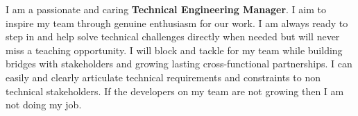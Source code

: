
\begin{cvsummary}
  \summary
    {I am a passionate and caring \textbf{Technical Engineering Manager}. I aim to inspire my team through genuine enthusiasm for our work. I am always ready to step in and help solve technical challenges directly when needed but will never miss a teaching opportunity. I will block and tackle for my team while building bridges with stakeholders and growing lasting cross-functional partnerships. I can easily and clearly articulate technical requirements and constraints to non technical stakeholders. If the developers on my team are not growing then I am not doing my job.
    }
\end{cvsummary}